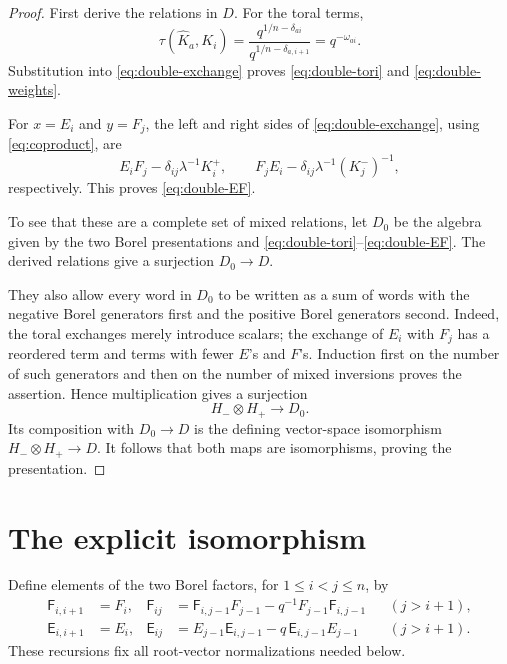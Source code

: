 \documentclass[11pt]{amsart}
\theoremstyle{remark}
\begin{document}
\begin{proof}
First derive the relations in $D$.
For the toral terms,
\[
 \tau(\widehat K_a,K_i)
  =\frac{q^{1/n-\delta_{ai}}}
         {q^{1/n-\delta_{a,i+1}}}
  =q^{-\omega_{ai}}.
\]
Substitution into \eqref{eq:double-exchange} proves
\eqref{eq:double-tori} and \eqref{eq:double-weights}.

For $x=E_i$ and $y=F_j$, the left and right sides of
\eqref{eq:double-exchange}, using \eqref{eq:coproduct}, are
\[
 E_iF_j-\delta_{ij}\lambda^{-1}K_i^+,
 \qquad
 F_jE_i-\delta_{ij}\lambda^{-1}(K_j^-)^{-1},
\]
respectively.  This proves \eqref{eq:double-EF}.

To see that these are a complete set of mixed relations, let
$D_0$ be the algebra given by the two Borel presentations and
\eqref{eq:double-tori}--\eqref{eq:double-EF}.  The derived relations
give a surjection $D_0\to D$.

They also allow every word in $D_0$ to be written as a sum of
words with the negative Borel generators first and the positive
Borel generators second.  Indeed, the toral exchanges merely
introduce scalars; the exchange of $E_i$ with $F_j$ has a reordered
term and terms with fewer $E$'s and $F$'s.  Induction first on the
number of such generators and then on the number of mixed
inversions proves the assertion.  Hence multiplication gives a
surjection
\[
 H_-\otimes H_+\longrightarrow D_0.
\]
Its composition with $D_0\to D$ is the defining vector-space
isomorphism $H_-\otimes H_+\to D$.  It follows that both maps are
isomorphisms, proving the presentation.
\end{proof}

\section{The explicit isomorphism}

Define elements of the two Borel factors, for $1\leq i<j\leq n$,
by
\begin{align}
 \mathsf F_{i,i+1}&=F_i,
 &
 \mathsf F_{ij}
   &=\mathsf F_{i,j-1}F_{j-1}
       -q^{-1}F_{j-1}\mathsf F_{i,j-1}
       &&(j>i+1),
 \label{eq:F-roots}\\
 \mathsf E_{i,i+1}&=E_i,
 &
 \mathsf E_{ij}
   &=E_{j-1}\mathsf E_{i,j-1}
       -q\,\mathsf E_{i,j-1}E_{j-1}
       &&(j>i+1).
 \label{eq:E-roots}
\end{align}
These recursions fix all root-vector normalizations needed below.
\end{document}
